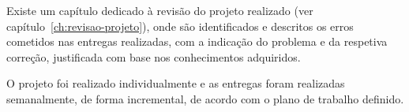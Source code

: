 Existe um capítulo dedicado à revisão do projeto realizado (ver capítulo~\ref{ch:revisao-projeto}), onde são identificados e descritos os erros cometidos nas entregas realizadas, com a indicação do problema e da respetiva correção, justificada com base nos conhecimentos adquiridos.

O projeto foi realizado individualmente e as entregas foram realizadas semanalmente, de forma incremental, de acordo com o plano de trabalho definido.
